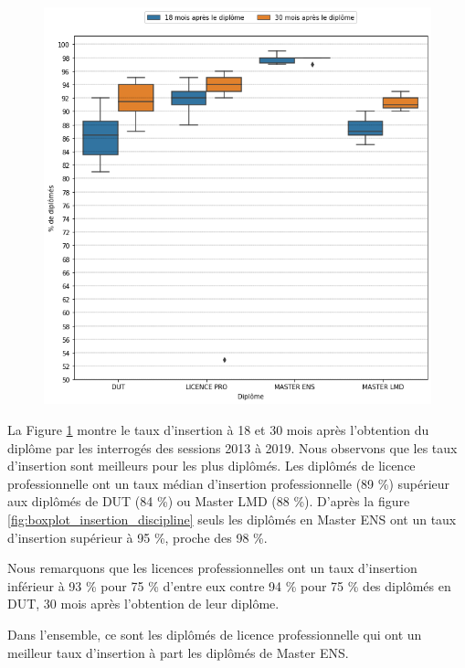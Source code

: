 \documentclass[12pt, a4paper, titlepage, table]{article}
\begin{document}
		\begin{figure}[H]
			\centering
			\includegraphics[width=1\textwidth]{../graphs/boxplot_insertion_diplome.png}
			\label{fig:boxplot_insertion_diplome}
		\end{figure}
	
	
	La Figure \ref{fig:boxplot_insertion_diplome} montre le taux d'insertion à 18 et 30 mois après l'obtention du diplôme par les interrogés des sessions 2013 à 2019. Nous observons que les taux d'insertion sont meilleurs pour les plus diplômés.
	Les diplômés de licence professionnelle ont un taux médian d'insertion professionnelle (89 \%) supérieur aux diplômés de DUT (84 \%) ou Master LMD (88 \%). D'après la figure \ref{fig:boxplot_insertion_discipline} seuls les diplômés en Master ENS ont un taux d'insertion supérieur à 95 \%, proche des 98 \%.
	
	Nous remarquons que les licences professionnelles ont un taux d'insertion inférieur à 93 \% pour 75 \% d'entre eux contre 94 \% pour 75 \% des diplômés en DUT, 30 mois après l'obtention de leur diplôme.
	
	Dans l'ensemble, ce sont les diplômés de licence professionnelle qui ont un meilleur taux d'insertion à part les diplômés de Master ENS.
	
\end{document}
